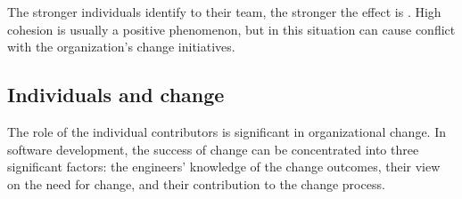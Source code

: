 The stronger individuals identify to their team, the stronger the effect is \cite{terry_attitude-behaviour_2000}. High cohesion is usually a positive phenomenon, but in this situation can cause conflict with the organization's change initiatives. 

\subsection{Individuals and change}

The role of the individual contributors is significant in organizational change. In software development, the success of change can be concentrated into three significant factors: the engineers' knowledge of the change outcomes, their view on the need for change, and their contribution to the change process. \cite{lenberg_initial_2017}










